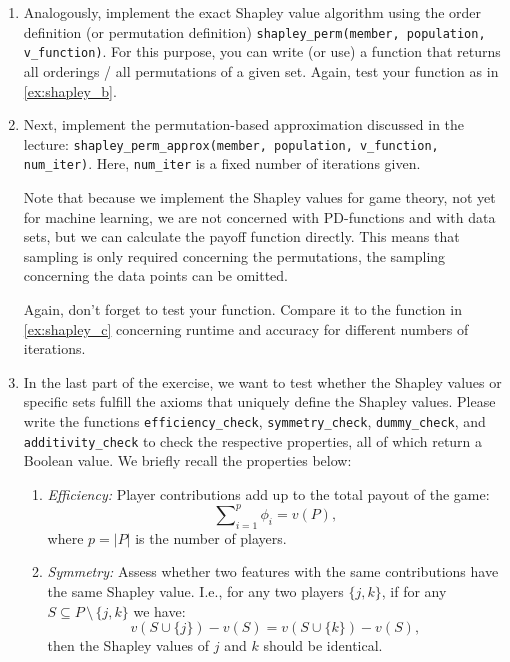 {\begin{enumerate}
    \item \label{ex:shapley_c}
    Analogously, implement the exact Shapley value algorithm using the order definition (or permutation definition) \texttt{shapley\_perm(member, population, v\_function)}.
    For this purpose, you can write (or use) a function that returns all orderings / all permutations of a given set.
    Again, test your function as in \ref{ex:shapley_b}.
    
    \item \label{ex:shapley_d}
    Next, implement the permutation-based approximation discussed in the lecture: \texttt{shapley\_perm\_approx(member, population, v\_function, num\_iter)}.
    Here, \texttt{num\_iter} is a fixed number of iterations given.
    
    Note that because we implement the Shapley values for game theory, not yet for machine learning, we are not concerned with PD-functions and with data sets, but we can calculate the payoff function directly.
    This means that sampling is only required concerning the permutations, the sampling concerning the data points can be omitted.

    Again, don't forget to test your function. Compare it to the function in \ref{ex:shapley_c} concerning runtime and accuracy for different numbers of iterations.
    
    \item \label{ex:shapley_e}
    In the last part of the exercise, we want to test whether the Shapley values or specific sets fulfill the axioms that uniquely define the Shapley values.
    Please write the functions \texttt{efficiency\_check}, \texttt{symmetry\_check}, \texttt{dummy\_check}, and \texttt{additivity\_check} to check the respective properties, all of which return a Boolean value.
    We briefly recall the properties below:
    \begin{enumerate}
    
        \item \textit{Efficiency:} Player contributions add up to the total payout of the game:
            $$\sum\nolimits_{i=1}^p\phi_i = v(P),$$
            where $p = |P|$ is the number of players.
            
        \item \textit{Symmetry:} Assess whether two features with the same contributions have the same Shapley value. I.e., for any two players $\{j,k\}$, if for any $S \subseteq P\, \setminus \, \{j,k\}$ we have:
            $$v(S \cup \{j\}) - v(S) = v(S \cup \{k\}) -  v(S),$$
        then the Shapley values of $j$ and $k$ should be identical.
        

\end{enumerate}
\end{enumerate}}

